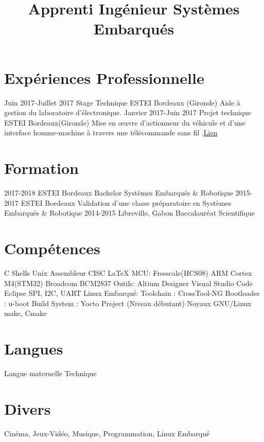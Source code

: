 \documentclass[10pts,a4paper,sans]{moderncv}
\title{Apprenti Ingénieur Systèmes Embarqués }
\begin{document}
\maketitle

\section{Exp\'{e}riences Professionnelle}
\cventry{} {Juin 2017-Juillet 2017} {Stage Technique} {ESTEI} {Bordeaux (Gironde)} {Aide à gestion du laboratoire d’électronique.} {}
\cventry{} {Janvier 2017-Juin 2017} {Projet technique} {ESTEI} {Bordeaux(Gironde)} {Mise en œuvre d'actionneur du véhicule et d'une interface homme-machine à travers une télécommande sans fil .\href{https://github.com/jorisoffouga/projet_vehicule_interactif_B2}{Lien}}
{} {}

\section{Formation}
\cventry{} {2017-2018} {ESTEI} {Bordeaux} {Bachelor Systèmes Embarqués \& Robotique} {}
\cventry{} {2015-2017} {ESTEI} {Bordeaux} {Validation d'une classe préparatoire en Systèmes Embarqués \& Robotique} {}
\cventry{} {2014-2015} {Libreville, Gabon} {Baccalauréat Scientifique} {} {}

\section{Compétences}
 {C \newline {} Shells Unix \newline {} Assembleur CISC \newline {} \LaTeX} {MCU:} {Fresscale(HCS08) \newline {} ARM Cortex M4(STM32)}
 {Broadcom BCM2837} {Outils:} {Altium Designer \newline {} Visual Studio Code \newline {} Eclipse}
 {SPI, I2C, UART} {Linux Embarqu\'{e}:}{ 
	Toolchain : CrossTool-NG
	\newline {} Bootloader : u-boot
	\newline {} Build System : Yocto Project (Niveau débutant)
	\newline {} Noyaux GNU/Linux
}
 {make, Cmake}

\section{Langues}
 {Langue maternelle}
 {Technique}
 
\newpage
\section{Divers}
 {Cinéma, Jeux-Vidéo, Musique, Programmation, Linux Embarqué}
\end{document}
